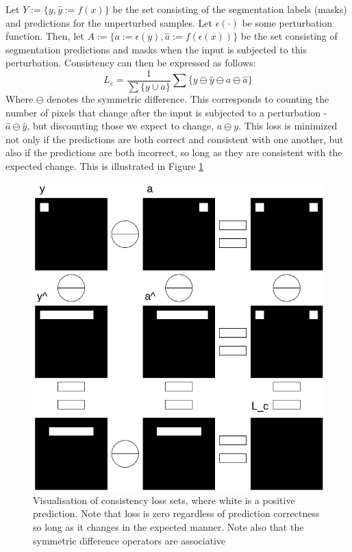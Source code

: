	Let \(Y:=\{y,\hat{y}:=f(x)\}\) be the set consisting of the segmentation labels (masks) and predictions for the unperturbed samples. Let \(\epsilon(\cdot)\) be some perturbation function. Then, let \(A:=\{a:=\epsilon(y),\hat{a}:=f(\epsilon(x))\}\) be the set consisting of segmentation predictions and masks when the input is subjected to this perturbation. Consistency can then be expressed as follows:
    \begin{equation}
		L_c = \frac{1}{\sum\{y \cup a \}} \sum \{y\ominus\hat{y}\ominus a\ominus\hat{a}\}
	\end{equation}
    Where \(\ominus \) denotes the symmetric difference. 
	This corresponds to counting the number of pixels that change after the input is subjected to a perturbation - \(\hat{a}\ominus \hat{y}\), but discounting those we expect to change, \(a\ominus y\). 
	This loss is minimized not only if the predictions are both correct and consistent with one another, but also if the predictions are both incorrect, so long as they are consistent with the expected change. This is illustrated in Figure \ref{loss_fn}
    \begin{figure}[h]
        \includegraphics[width=\linewidth]{illustrations/loss_vis.drawio.png}
        \caption{Visualisation of consistency loss sets, where white is a positive prediction. Note that loss is zero regardless of prediction correctness so long as it changes in the expected manner. Note also that the symmetric difference operators are associative}
        \label{loss_fn}
    \end{figure}    
    
